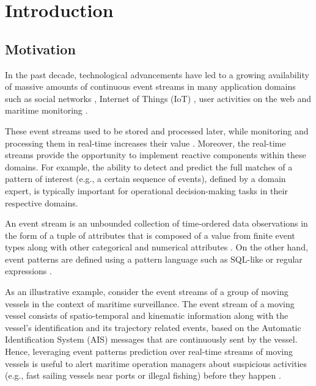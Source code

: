 \chapter{Introduction}


\section{Motivation}
\par In the past decade, technological advancements have led to a growing availability of massive amounts of continuous event streams in many application domains such as social networks \cite{reuter2012event,mathioudakis2010twittermonitor}, Internet of Things (IoT) \cite{miorandi2012internet}, user activities on the web \cite{banerjee2001clickstream,metwally2005duplicate} and maritime monitoring \cite{patroumpas2015event,laxhammar2010conformal}.



\par These event streams used to be stored and processed later, while monitoring and processing them in real-time increases their value \cite{carney2002monitoring}. Moreover, the real-time streams provide the opportunity to implement reactive components within these domains.  For example, the ability to detect and predict the full matches of a pattern of interest (e.g., a certain sequence of events), defined by a domain expert, is typically important for operational decision-making tasks in their respective domains.

\par An event stream is an unbounded collection of time-ordered data observations in the form of a tuple of attributes that is composed of a value from finite event types along with other categorical and numerical attributes \cite{agrawal2008efficient,schultz2009distributed,zhou_pattern_2015,flouris2017issues}.  On the other hand, event patterns are defined using a pattern language such as SQL-like \cite{schultz2009distributed} or regular expressions \cite{alevizos2017event}.

\par As an illustrative example, consider the event streams of a group of moving vessels in the context of maritime surveillance. The event stream of a moving vessel consists of spatio-temporal and kinematic information along with the vessel's identification and its trajectory related events, based on the Automatic Identification System (AIS) \cite{ais} messages that are continuously sent by the vessel. Hence, leveraging event patterns prediction over real-time streams of moving vessels is useful to alert maritime operation managers about suspicious activities (e.g., fast sailing vessels near ports or illegal fishing) before they happen \cite{patroumpas2015event}. 

